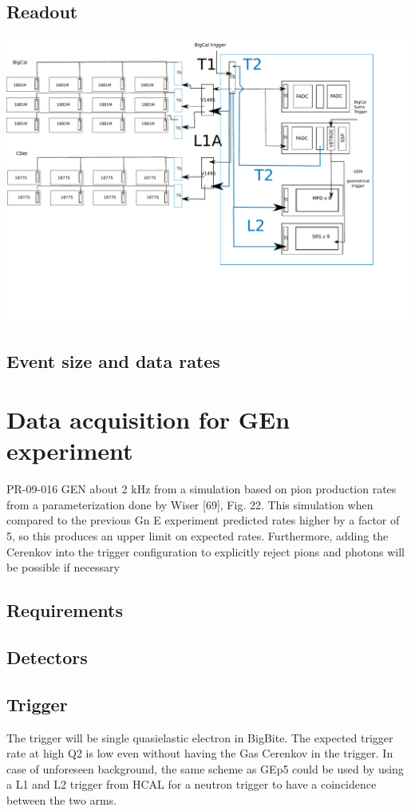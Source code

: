 \documentclass{article}
\begin{document}
\subsection{Readout}

\includegraphics[scale=0.55]{figs/SBSlayoutOld.pdf}\\


\subsection{Event size and data rates}
\section{Data acquisition for GEn experiment}

PR-09-016 GEN
about 2 kHz from a simulation based on pion production rates from a parameterization done by
Wiser [69], Fig. 22. This simulation when compared to the previous Gn
E experiment predicted rates
higher by a factor of 5, so this produces an upper limit on expected rates. Furthermore, adding the
Cerenkov into the trigger configuration to explicitly reject pions and photons will be possible if
necessary


\subsection{Requirements}
\subsection{Detectors}
\subsection{Trigger}
The trigger will be single quasielastic electron in BigBite.
The expected trigger rate at high Q2 is low even without having the Gas Cerenkov in the trigger.
In case of unforeseen background, the same scheme as GEp5 could be used by using a L1 and L2 trigger from HCAL for a neutron trigger
to have a coincidence between the two arms.
\end{document}
